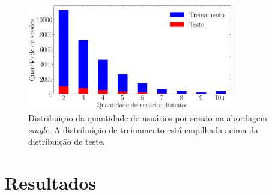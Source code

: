   \begin{figure}[ht]
    \centering
    \includegraphics[width=0.8\textwidth]{chapters/chap04/images/histograma.png}
    \caption{Distribuição da quantidade de usuários por sessão na abordagem
    \textit{single}. A distribuição de treinamento está empilhada acima da
    distribuição de teste.}
    \label{fig:next-item-single}
  \end{figure}




  \chapter{Resultados}


